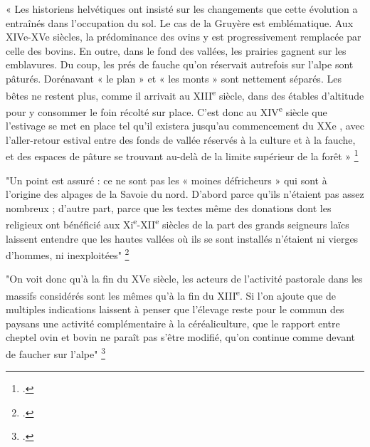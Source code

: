 \documentclass[12pt,a4paper]{report}
\begin{document}
« Les historiens helvétiques ont insisté sur les changements que cette évolution a entraînés dans l’occupation du sol. Le cas de la Gruyère est emblématique. Aux XIVe-XVe siècles, la prédominance des ovins y est progressivement remplacée par celle des bovins. En outre, dans le fond des vallées, les prairies gagnent sur les emblavures. Du coup, les prés de fauche qu’on réservait autrefois sur l’alpe sont pâturés. Dorénavant « le plan » et « les monts » sont nettement séparés. Les bêtes ne restent plus, comme il arrivait au XIII\textsuperscript{e} siècle, dans des étables d’altitude pour y consommer le foin récolté sur place. C’est donc au XIV\textsuperscript{e} siècle que l’estivage se met en place tel qu’il existera jusqu’au commencement du XXe , avec l’aller-retour estival entre des fonds de vallée réservés à la culture et à la fauche, et des espaces de pâture se trouvant au-delà de la limite supérieur
de la forêt » \footcite{NCarrierEstivage}

"Un point est assuré : ce ne sont pas les « moines défricheurs » qui sont à l’origine des alpages de la Savoie du nord. D’abord parce qu’ils n’étaient pas assez nombreux ; d’autre part, parce que les textes même des donations dont les religieux ont bénéficié aux Xi\textsuperscript{e}-XII\textsuperscript{e} siècles de la part des grands seigneurs laïcs laissent entendre que les hautes vallées où ils se sont installés n’étaient ni vierges d’hommes, ni inexploitées" \footcite{NCarrierEstivage}

"On voit donc qu’à la fin du XVe siècle, les acteurs de l’activité pastorale dans les massifs considérés sont les mêmes qu’à la fin du XIII\textsuperscript{e}. Si l’on ajoute que de multiples indications laissent à penser que l’élevage reste pour le commun des paysans une activité complémentaire à la céréaliculture, que le rapport entre cheptel ovin et bovin ne paraît pas s’être modifié, qu’on continue comme devant de faucher sur l’alpe" \footcite{NCarrierEstivage}
\end{document}
